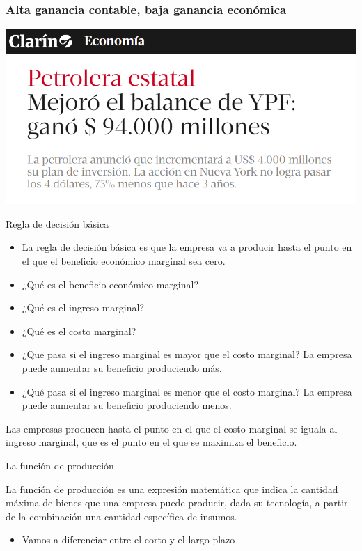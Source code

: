 \documentclass{beamer}
\begin{document}
\begin{frame}
    \frametitle{Alta ganancia contable, baja ganancia económica}
    \centering
    \includegraphics[scale=0.6]{../YPF.png}
\end{frame}

\begin{frame}{Regla de decisión básica}

    \begin{itemize}
        \item La regla de decisión básica es que la empresa va a producir hasta el punto en el que el beneficio económico marginal sea cero.
        \item ¿Qué es el beneficio económico marginal?
        \item ¿Qué es el ingreso marginal?
        \item ¿Qué es el costo marginal?
        \item ¿Que pasa si el ingreso marginal es mayor que el costo marginal? La empresa puede aumentar su beneficio produciendo más.
        \item ¿Qué pasa si el ingreso marginal es menor que el costo marginal? La empresa puede aumentar su beneficio produciendo menos.
    \end{itemize}

    \begin{boxA}
        \begin{center}
            Las empresas producen hasta el punto en el que el costo marginal se iguala al ingreso marginal, que es el punto en el que se maximiza el beneficio.
        \end{center}
    \end{boxA}
\end{frame}

\begin{frame}{La función de producción}
    \begin{boxA}
        \begin{center}
            La función de producción es una expresión matemática que indica la cantidad máxima de bienes que una empresa puede producir, dada su tecnología, a partir de la combinación una cantidad específica de insumos.
        \end{center}
    \end{boxA}
    \begin{itemize}
        \item Vamos a diferenciar entre el corto y el largo plazo
    \end{itemize}
\end{frame}
\end{document}
